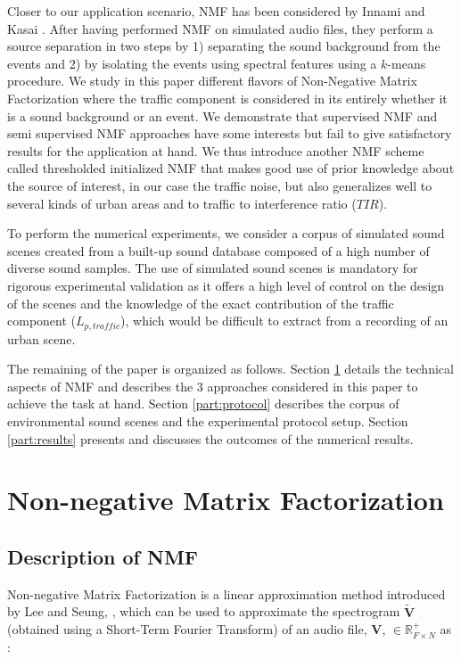 \documentclass[twocolumn]{svjour3}          %
\begin{document}
Closer to our application scenario, NMF has been considered by Innami and Kasai \cite{satoshi_innami_nmf-based_2012}. After having performed NMF on simulated audio files, they perform a source separation in two steps by 1) separating the sound background from the events and 2) by isolating the events using spectral features using a $k$-means procedure.
We study in this paper different flavors of Non-Negative Matrix Factorization where the traffic component is considered in its entirely whether it is a sound background or an event. We demonstrate that supervised NMF and semi supervised NMF approaches have some interests but fail to give satisfactory results for the application at hand. We thus introduce another NMF scheme called thresholded initialized NMF that makes good use of prior knowledge about the source of interest, in our case the traffic noise, but also generalizes well to several kinds of urban areas and to traffic to interference ratio ($TIR$).

To perform the numerical experiments, we consider a corpus of simulated sound scenes created from a built-up sound database composed of a high number of diverse sound samples. The use of simulated sound scenes is mandatory for rigorous experimental validation as it offers a high level of control on the design of the scenes and the knowledge of the exact contribution of the traffic component ($L_{p,traffic}$), which would be difficult to extract from a recording of an urban scene.

The remaining of the paper is organized as follows. Section \ref{part:nmf} details the technical aspects of NMF and describes the 3 approaches considered in this paper to achieve the task at hand. Section \ref{part:protocol} describes the corpus of environmental sound scenes and the experimental protocol setup. Section \ref{part:results} presents and discusses the outcomes of the numerical results.

\section{Non-negative Matrix Factorization}\label{part:nmf}
\subsection{Description of NMF}

Non-negative Matrix Factorization is a linear approximation method introduced by Lee and Seung, \cite{lee_learning_1999}, which can be used to approximate the spectrogram $\mathbf{\tilde{V}}$ (obtained using a Short-Term Fourier Transform) of an audio file, $\mathbf{V}$, $\in \mathbb{R}^+_{F \times N}$ as :
\end{document}
